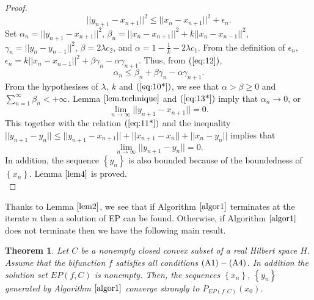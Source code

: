 \documentclass{aims}
\newtheorem{theorem}{Theorem}[section]
\theoremstyle{definition}
\begin{document}
\begin{proof}
\begin{equation}
 ||y_{n+1} - x_{n+1}||^2\leq ||x_n-x_{n+1}||^2+\epsilon_n.
\end{equation}
Set $\alpha_n=||y_{n+1} - x_{n+1}||^2$, $\beta_n=||x_n-x_{n+1}||^2+k||x_n-x_{n-1}||^2$, $\gamma_n=||y_n-y_{n-1}||^2$, $\beta=2\lambda c_2$, 
and  $\alpha=1-\frac{1}{k}-2\lambda c_1$. From the definition of $\epsilon_n$, $\epsilon_n=k||x_n-x_{n-1}||^2+\beta \gamma_n-\alpha \gamma_{n+1}$. 
Thus, from $(\ref{eq:12})$, 
\begin{equation}\label{eq:13*}
\alpha_n\le \beta_n+\beta \gamma_n-\alpha \gamma_{n+1}.
\end{equation}
From the hypothesises of $\lambda, ~k$ and $(\ref{eq:10*})$, we see that $\alpha>\beta\ge 0$ and $\sum_{n=1}^\infty \beta_n<+\infty$. Lemma 
$\ref{lem.technique}$ and $(\ref{eq:13*})$ imply that $\alpha_n\to 0$, or 
\begin{equation}\label{eq:14}
\lim_{n\to\infty}||y_{n+1}- x_{n+1}||=0.
\end{equation}
This together with the relation $(\ref{eq:11*})$ and the inequality $||y_{n+1}-y_{n}||\le||y_{n+1}-x_{n+1}||+||x_{n+1}-x_n||+||x_{n}-y_{n}||$ implies that 
\begin{equation}\label{eq:15}
\lim_{n\to\infty}||y_{n+1} - y_{n}||=0.
\end{equation}
In addition, the sequence $\left\{y_{n}\right\}$ is also bounded because of the boundedness of $\left\{x_n\right\}$. Lemma $\ref{lem4}$ is proved.\\
\end{proof}
Thanks to Lemma $\ref{lem2}$, we see that if Algorithm $\ref{algor1}$ terminates at the iterate $n$ then a solution of EP can be found. 
Otherwise, if Algorithm $\ref{algor1}$ 
does not terminate then we have the following main result.
\begin{theorem}\label{theo.1}
Let $C$ be a nonempty closed convex subset of a real Hilbert space $H$. Assume that the bifunction $f$ satisfies all conditions $\rm (A1)-(A4)$. 
In addition the solution set $EP(f,C)$ is nonempty. Then, the sequences $\left\{x_n\right\}$, $\left\{y_n\right\}$ generated by Algorithm 
$\ref{algor1}$ converge strongly to $P_{EP(f,C)}(x_0)$.
\end{theorem}
\end{document}
